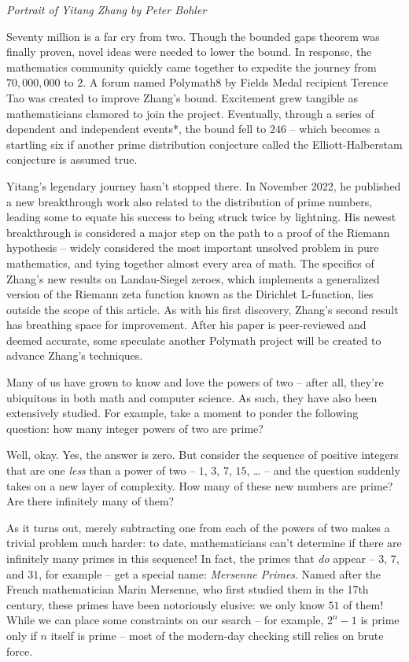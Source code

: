 \documentclass{article}
\begin{document}
\begin{multicols}{3}
\begin{center}
    \textit{Portrait of Yitang Zhang by Peter Bohler}
\end{center}

Seventy million is a far cry from two. Though the bounded gaps theorem was finally proven, novel ideas were needed to lower the bound. In response, the mathematics community quickly came together to expedite the journey from $70,000,000$ to $2$. A forum named Polymath8 by Fields Medal recipient Terence Tao was created to improve Zhang’s bound. Excitement grew tangible as mathematicians clamored to join the project. Eventually, through a series of dependent and independent events*, the bound fell to $246$ – which becomes a startling six if another prime distribution conjecture called the Elliott-Halberstam conjecture is assumed true. 

Yitang’s legendary journey hasn’t stopped there. In November 2022, he published a new breakthrough work also related to the distribution of prime numbers, leading some to equate his success to being struck twice by lightning. His newest breakthrough is considered a major step on the path to a proof of the Riemann hypothesis – widely considered the most important unsolved problem in pure mathematics, and tying together almost every area of math. The specifics of Zhang’s new results on Landau-Siegel zeroes, which implements a generalized version of the Riemann zeta function known as the Dirichlet L-function, lies outside the scope of this article. As with his first discovery, Zhang’s second result has breathing space for improvement. After his paper is peer-reviewed and deemed accurate, some speculate another Polymath project will be created to advance Zhang’s techniques.
\closearticle

Many of us have grown to know and love the powers of two – after all, they’re ubiquitous in both math and computer science. As such, they have also been extensively studied. For example, take a moment to ponder the following question: how many integer powers of two are prime?

Well, okay. Yes, the answer is zero. But consider the sequence of positive integers that are one \textit{less} than a power of two – $1$, $3$, $7$, $15$, … – and the question suddenly takes on a new layer of complexity. How many of these new numbers are prime? Are there infinitely many of them?

As it turns out, merely subtracting one from each of the powers of two makes a trivial problem much harder: to date, mathematicians can’t determine if there are infinitely many primes in this sequence! In fact, the primes that \textit{do} appear – $3$, $7$, and $31$, for example – get a special name: \textit{Mersenne Primes}. Named after the French mathematician Marin Mersenne, who first studied them in the 17th century, these primes have been notoriously elusive: we only know $51$ of them! While we can place some constraints on our search – for example, $2^n-1$ is prime only if $n$ itself is prime – most of the modern-day checking still relies on brute force.


\end{multicols}
\end{document}
